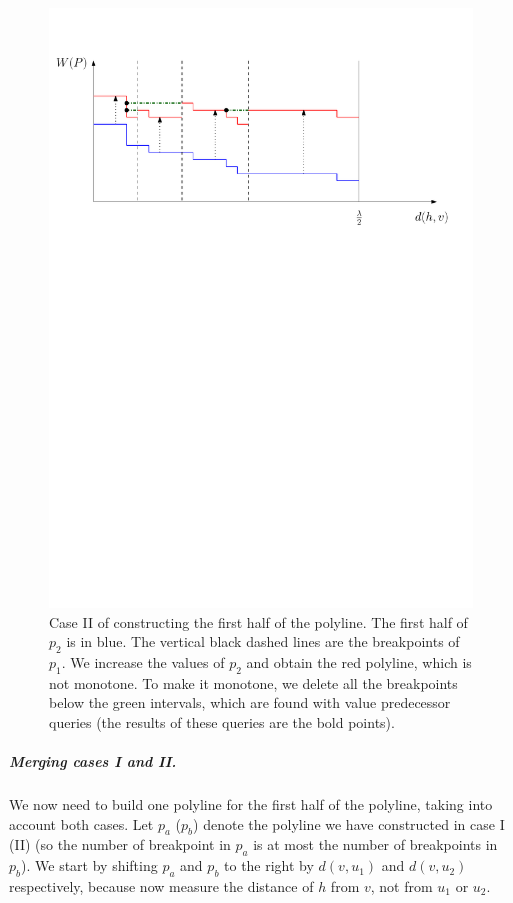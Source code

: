 \documentclass[a4paper,UKenglish]{lipics-v2016}
\theoremstyle{plain}
\renewcommand{\paragraph}{\subparagraph}
\begin{document}
\begin{figure}[h]
\begin{center}
\includegraphics[scale=0.6]{polyline_first_half_construction_case2}
\end{center}
\caption{Case II of constructing the first half of the polyline. The first half of $p_2$ is in blue. The vertical black dashed lines are the breakpoints of $p_1$. We increase the values of $p_{2}$ and obtain the red polyline, which is not monotone. To make it monotone, we delete all the breakpoints below the green intervals, which are found with value predecessor queries (the results of these queries are the bold points).\label{figure of the second case in the construction of the first half of the polyline}
}
\end{figure}

\paragraph{Merging cases I and II.}
We now need to build one polyline for the first half of the polyline, taking into account both cases. Let $p_a$ ($p_b$) denote the polyline we have constructed in case I (II) (so the number of breakpoint in $p_a$ is at most the number of breakpoints in $p_b$). We start by shifting $p_a$ and $p_b$ to the right by $d(v,u_1)$ and $d(v,u_2)$ respectively, because now measure the distance of $h$ from $v$, not from $u_1$ or $u_2$. 
\end{document}
